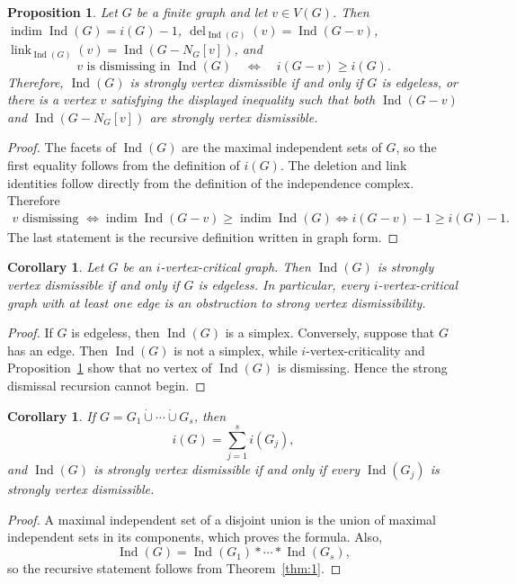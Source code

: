 \documentclass[11pt]{amsart}
\DeclareMathOperator{\indim}{indim}
\DeclareMathOperator{\link}{link}
\DeclareMathOperator{\del}{del}
\DeclareMathOperator{\Ind}{Ind}
\newtheorem{proposition}[theorem]{Proposition}
\newtheorem{corollary}[theorem]{Corollary}
\theoremstyle{definition}
\begin{document}
	\begin{proposition}\label{prop:6}
		Let $G$ be a finite graph and let $v\in V(G)$.  Then $\indim\Ind(G)=i(G)-1$, $\del_{\Ind(G)}(v)=\Ind(G-v)$, $\link_{\Ind(G)}(v)=\Ind(G-N_G[v])$, and
		\[
		v\text{ is dismissing in }\Ind(G)
		\quad\Longleftrightarrow\quad
		i(G-v)\geq i(G).
		\]
		Therefore, $\Ind(G)$ is strongly vertex dismissible if and only if $G$ is edgeless, or there is a vertex $v$ satisfying the displayed inequality such that both $\Ind(G-v)$ and $\Ind(G-N_G[v])$ are strongly vertex dismissible.
	\end{proposition}
	
	\begin{proof}
		The facets of $\Ind(G)$ are the maximal independent sets of $G$, so the first equality follows from the definition of $i(G)$.  The deletion and link identities follow directly from the definition of the independence complex.  Therefore
		\[
		\begin{aligned}
			v\text{ dismissing }\Longleftrightarrow
			\indim\Ind(G-v)\geq\indim\Ind(G)\Longleftrightarrow i(G-v)-1\geq i(G)-1.
		\end{aligned}
		\]
		The last statement is the recursive definition written in graph form.
	\end{proof}
	
	\begin{corollary}\label{cor:6}
		Let $G$ be an $i$-vertex-critical graph. Then $\Ind(G)$ is strongly vertex dismissible if and only if $G$ is edgeless. In particular, every $i$-vertex-critical graph with at least one edge is an obstruction to strong vertex dismissibility.
	\end{corollary}
	
	\begin{proof}
		If $G$ is edgeless, then $\Ind(G)$ is a simplex.  Conversely, suppose that $G$ has an edge.  Then $\Ind(G)$ is not a simplex, while $i$-vertex-criticality and Proposition~\ref{prop:6} show that no vertex of $\Ind(G)$ is dismissing.  Hence the strong dismissal recursion cannot begin.
	\end{proof}
	
	\begin{corollary}\label{cor:7}
		If $G=G_1\mathbin{\dot\cup}\cdots\mathbin{\dot\cup}G_s$, then
		\[
		i(G)=\sum_{j=1}^s i(G_j),
		\]
		and $\Ind(G)$ is strongly vertex dismissible if and only if every $\Ind(G_j)$ is strongly vertex dismissible.
	\end{corollary}
	
	\begin{proof}
		A maximal independent set of a disjoint union is the union of maximal independent sets in its components, which proves the formula.  Also,
		\[
		\Ind(G)=\Ind(G_1)*\cdots*\Ind(G_s),
		\]
		so the recursive statement follows from Theorem~\ref{thm:1}.
	\end{proof}
	
\end{document}

